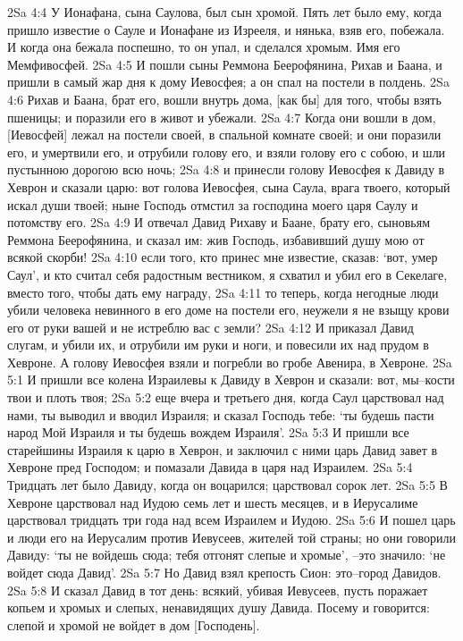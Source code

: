 2Sa 4:4  У Ионафана, сына Саулова, был сын хромой. Пять лет было ему, когда пришло известие о Сауле и Ионафане из Изрееля, и нянька, взяв его, побежала. И когда она бежала поспешно, то он упал, и сделался хромым. Имя его Мемфивосфей.
2Sa 4:5  И пошли сыны Реммона Беерофянина, Рихав и Баана, и пришли в самый жар дня к дому Иевосфея; а он спал на постели в полдень.
2Sa 4:6  Рихав и Баана, брат его, вошли внутрь дома, [как бы] для того, чтобы взять пшеницы; и поразили его в живот и убежали.
2Sa 4:7  Когда они вошли в дом, [Иевосфей] лежал на постели своей, в спальной комнате своей; и они поразили его, и умертвили его, и отрубили голову его, и взяли голову его с собою, и шли пустынною дорогою всю ночь;
2Sa 4:8  и принесли голову Иевосфея к Давиду в Хеврон и сказали царю: вот голова Иевосфея, сына Саула, врага твоего, который искал души твоей; ныне Господь отмстил за господина моего царя Саулу и потомству его.
2Sa 4:9  И отвечал Давид Рихаву и Баане, брату его, сыновьям Реммона Беерофянина, и сказал им: жив Господь, избавивший душу мою от всякой скорби!
2Sa 4:10  если того, кто принес мне известие, сказав: `вот, умер Саул', и кто считал себя радостным вестником, я схватил и убил его в Секелаге, вместо того, чтобы дать ему награду,
2Sa 4:11  то теперь, когда негодные люди убили человека невинного в его доме на постели его, неужели я не взыщу крови его от руки вашей и не истреблю вас с земли?
2Sa 4:12  И приказал Давид слугам, и убили их, и отрубили им руки и ноги, и повесили их над прудом в Хевроне. А голову Иевосфея взяли и погребли во гробе Авенира, в Хевроне.
2Sa 5:1  И пришли все колена Израилевы к Давиду в Хеврон и сказали: вот, мы--кости твои и плоть твоя;
2Sa 5:2  еще вчера и третьего дня, когда Саул царствовал над нами, ты выводил и вводил Израиля; и сказал Господь тебе: `ты будешь пасти народ Мой Израиля и ты будешь вождем Израиля'.
2Sa 5:3  И пришли все старейшины Израиля к царю в Хеврон, и заключил с ними царь Давид завет в Хевроне пред Господом; и помазали Давида в царя над Израилем.
2Sa 5:4  Тридцать лет было Давиду, когда он воцарился; царствовал сорок лет.
2Sa 5:5  В Хевроне царствовал над Иудою семь лет и шесть месяцев, и в Иерусалиме царствовал тридцать три года над всем Израилем и Иудою.
2Sa 5:6  И пошел царь и люди его на Иерусалим против Иевусеев, жителей той страны; но они говорили Давиду: `ты не войдешь сюда; тебя отгонят слепые и хромые', --это значило: `не войдет сюда Давид'.
2Sa 5:7  Но Давид взял крепость Сион: это--город Давидов.
2Sa 5:8  И сказал Давид в тот день: всякий, убивая Иевусеев, пусть поражает копьем и хромых и слепых, ненавидящих душу Давида. Посему и говорится: слепой и хромой не войдет в дом [Господень].
